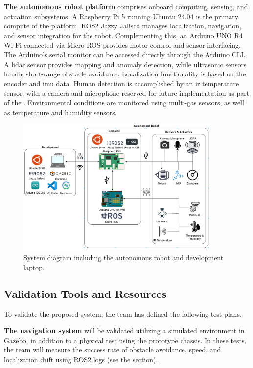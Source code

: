 \textbf{The autonomous robot platform} comprises onboard computing, sensing, and actuation subsystems. A Raspberry Pi 5 running Ubuntu 24.04 is the primary compute of the platform. ROS2 Jazzy Jalisco manages localization, navigation, and sensor integration for the robot. Complementing this, an Arduino UNO R4 Wi-Fi connected via Micro ROS provides motor control and sensor interfacing. The Arduino’s serial monitor can be accessed directly through the Arduino CLI. A \gls{lidar} sensor provides mapping and anomaly detection, while ultrasonic sensors handle short-range obstacle avoidance. Localization functionality is based on the encoder and \gls{imu} data. Human detection is accomplished by an \gls{ir} temperature sensor, with a camera and microphone reserved for future implementation as part of the . Environmental conditions are monitored using multi-gas sensors, as well as temperature and humidity sensors.

\begin{figure}[H]
    \centering
    \includegraphics[width=0.9\textwidth]{images/system_archietecture.png}
    \caption{System diagram including the autonomous robot and development laptop.}
    \label{fig:system_architecture}
\end{figure}

\subsection{Validation Tools and Resources}

To validate the proposed system, the team has defined the following test plans.

\textbf{The navigation system} will be validated utilizing a simulated environment in Gazebo, in addition to a physical test using the prototype chassis. In these tests, the team will measure the success rate of obstacle avoidance, speed, and localization drift using ROS2 logs (see the  section).

